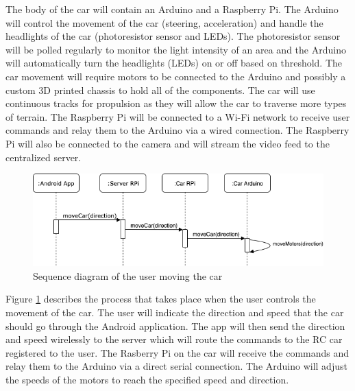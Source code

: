 \documentclass[letterpaper,12pt]{report}
\begin{document}
	The body of the car will contain an Arduino and a Raspberry Pi. The Arduino
	will control the movement of the car (steering, acceleration) and handle the
	headlights of the car (photoresistor sensor and LEDs). The photoresistor
	sensor will be polled regularly to monitor the light intensity of an area
	and the Arduino will automatically turn the headlights (LEDs) on or off
	based on threshold. The car movement will require motors to be connected to
	the Arduino and possibly a custom 3D printed chassis to hold all of the
	components. The car will use continuous tracks for propulsion as they will
	allow the car to traverse more types of terrain. The Raspberry Pi will be
	connected to a Wi-Fi network to receive user commands and relay them to the
	Arduino via a wired connection. The Raspberry Pi will also be connected to
	the camera and will stream the video feed to the centralized server.\\

	\begin{figure}[H]
    	\centering
		\includegraphics[width=\linewidth]{Proposal_Car_Movement_Sequence.png}
    	\caption{Sequence diagram of the user moving the car}
    	\label{fig:movement}
	\end{figure}

	Figure \ref{fig:movement} describes the process that takes place when
	the user controls the movement of the car. The user will indicate the
	direction and speed that the car should go through the Android application.
	The app will then send the direction and speed wirelessly to the server
	which will route the commands to the RC car registered to the user. The
	Rasberry Pi on the car will receive the commands and relay them to the
	Arduino via a direct serial connection. The Arduino will adjust the speeds
	of the motors to reach the specified speed and direction.
\end{document}
